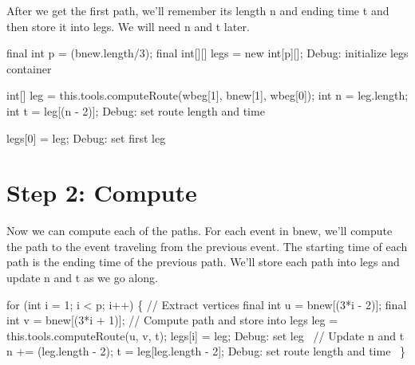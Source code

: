 After we get the first path, we'll remember its length {\Tt{}n\nwendquote} and ending time
{\Tt{}t\nwendquote} and then store it into {\Tt{}legs\nwendquote}. We will need {\Tt{}n\nwendquote} and {\Tt{}t\nwendquote} later.

\nwenddocs{}\endmoddef\nwstartdeflinemarkup{}\nwenddeflinemarkup
final int p = (bnew.length/3);
final int[][] legs = new int[p][];
\LA{}Debug: initialize legs container~{\nwtagstyle{}}\RA{}

int[] leg = this.tools.computeRoute(wbeg[1], bnew[1], wbeg[0]);
int n = leg.length;
int t = leg[(n - 2)];
\LA{}Debug: set route length and time~{\nwtagstyle{}}\RA{}

legs[0] = leg;
\LA{}Debug: set first leg~{\nwtagstyle{}}\RA{}
\nwendcode{}\nwdocspar

\section{Step 2: Compute}

Now we can compute each of the paths. For each event in {\Tt{}bnew\nwendquote}, we'll compute
the path to the event traveling from the previous event. The starting time of
each path is the ending time of the previous path. We'll store each path into
{\Tt{}legs\nwendquote} and update {\Tt{}n\nwendquote} and {\Tt{}t\nwendquote} as we go along.

\nwenddocs{}\endmoddef\nwstartdeflinemarkup{}\nwenddeflinemarkup
for (int i = 1; i < p; i++) \{
  // Extract vertices
  final int u = bnew[(3*i - 2)];
  final int v = bnew[(3*i + 1)];
  // Compute path and store into legs
  leg = this.tools.computeRoute(u, v, t);
  legs[i] = leg;
  \LA{}Debug: set leg~{\nwtagstyle{}}\RA{}
  // Update n and t
  n += (leg.length - 2);
  t = leg[leg.length - 2];
  \LA{}Debug: set route length and time~{\nwtagstyle{}}\RA{}
\}
\nwendcode{}\nwdocspar

